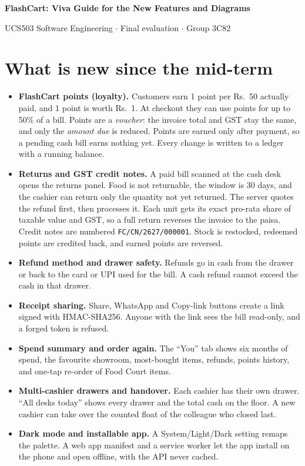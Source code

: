 \documentclass[10pt,a4paper]{article}
\newcommand{\key}[1]{\textbf{#1}}
\begin{document}
{\LARGE\bfseries FlashCart: Viva Guide for the New Features and Diagrams}\par
\vspace{2pt}
{\small UCS503 Software Engineering \quad $\cdot$ \quad Final evaluation \quad $\cdot$ \quad Group 3C82}\par

\section{What is new since the mid-term}
\begin{itemize}
  \item \key{FlashCart points (loyalty).} Customers earn 1 point per Rs.~50 actually paid, and 1 point is worth Rs.~1. At checkout they can use points for up to 50\% of a bill. Points are a \emph{voucher}: the invoice total and GST stay the same, and only the \emph{amount due} is reduced. Points are earned only after payment, so a pending cash bill earns nothing yet. Every change is written to a ledger with a running balance.
  \item \key{Returns and GST credit notes.} A paid bill scanned at the cash desk opens the returns panel. Food is not returnable, the window is 30 days, and the cashier can return only the quantity not yet returned. The server quotes the refund first, then processes it. Each unit gets its exact pro-rata share of taxable value and GST, so a full return reverses the invoice to the paisa. Credit notes are numbered \texttt{FC/CN/2627/000001}. Stock is restocked, redeemed points are credited back, and earned points are reversed.
  \item \key{Refund method and drawer safety.} Refunds go in cash from the drawer or back to the card or UPI used for the bill. A cash refund cannot exceed the cash in that drawer.
  \item \key{Receipt sharing.} Share, WhatsApp and Copy-link buttons create a link signed with HMAC-SHA256. Anyone with the link sees the bill read-only, and a forged token is refused.
  \item \key{Spend summary and order again.} The ``You'' tab shows six months of spend, the favourite showroom, most-bought items, refunds, points history, and one-tap re-order of Food Court items.
  \item \key{Multi-cashier drawers and handover.} Each cashier has their own drawer. ``All desks today'' shows every drawer and the total cash on the floor. A new cashier can take over the counted float of the colleague who closed last.
  \item \key{Dark mode and installable app.} A System/Light/Dark setting remaps the palette. A web app manifest and a service worker let the app install on the phone and open offline, with the API never cached.
\end{itemize}
\end{document}
